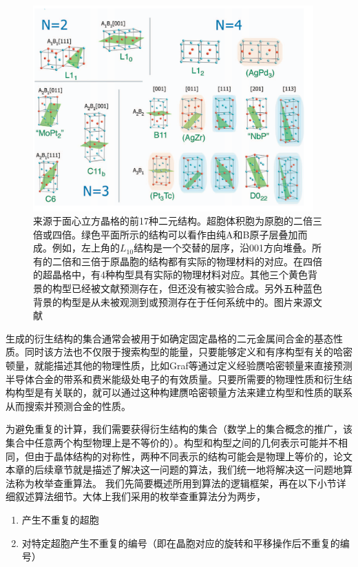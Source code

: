 \begin{figure}
  \includegraphics[width=0.96\textwidth]{figs/ch4_fcc_234_ss.png}
  \centering
  \caption{来源于面心立方晶格的前17种二元结构。超胞体积胞为原胞的二倍三倍或四倍。绿色平面所示的结构可以看作由纯A和B原子层叠加而成。例如，左上角的$L_{10}$结构是一个交替的层序，沿001方向堆叠。所有的二倍和三倍于原晶胞的结构都有实际的物理材料的对应。在四倍的超晶格中，有4种构型具有实际的物理材料对应。其他三个黄色背景的构型已经被文献\cite{curtarolo2005accuracy}预测存在，但还没有被实验合成。另外五种蓝色背景的构型是从未被观测到或预测存在于任何系统中的。图片来源文献\cite{hart2008algorithm}}
  \label{fig:ch4_fcc_234_ss}
\end{figure}

生成的衍生结构的集合通常会被用于如确定固定晶格的二元金属间合金的基态性质。同时该方法也不仅限于搜索构型的能量，只要能够定义和有序构型有关的哈密顿量，就能描述其他的物理性质，比如Graf等\cite{graf2005direct}通过定义经验赝哈密顿量来直接预测半导体合金的带系和费米能级处电子的有效质量。只要所需要的物理性质和衍生结构构型是有关联的，就可以通过这种构建赝哈密顿量方法来建立构型和性质的联系从而搜索并预测合金的性质。

为避免重复的计算，我们需要获得衍生结构的集合（数学上的集合概念的推广，该集合中任意两个构型物理上是不等价的）。构型和构型之间的几何表示可能并不相同，但由于晶体结构的对称性，两种不同表示的结构可能会是物理上等价的，论文本章的后续章节就是描述了解决这一问题的算法，我们统一地将解决这一问题地算法称为枚举查重算法。
我们先简要概述所用到算法的逻辑框架，再在以下小节详细叙述算法细节。大体上我们采用的枚举查重算法分为两步，
\begin{enumerate}
  \item 产生不重复的超胞
  \item 对特定超胞产生不重复的编号（即在晶胞对应的旋转和平移操作后不重复的编号）
\end{enumerate}

